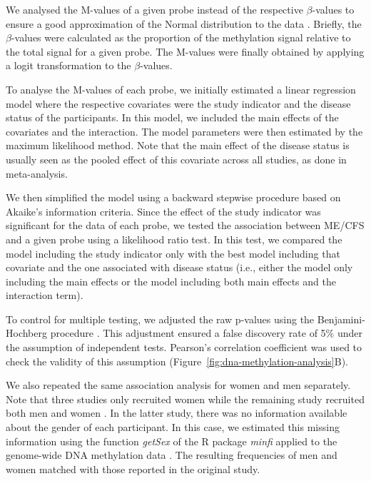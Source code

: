 We analysed the M-values of a given probe instead of the respective $\beta$-values to ensure a good approximation of the Normal distribution to the data \citep{du2010ComparisonBetavalue}. Briefly, the $\beta$-values were calculated as the proportion of the methylation signal relative to the total signal for a given probe. The M-values were finally obtained by applying a logit transformation to the $\beta$-values.

To analyse the M-values of each probe, we initially estimated a linear regression model where the respective covariates were the study indicator and the disease status of the participants. In this model, we included the main effects of the covariates and the interaction. The model parameters were then estimated by the maximum likelihood method. Note that the main effect of the disease status is usually seen as the pooled effect of this covariate across all studies, as done in meta-analysis.

We then simplified the model using a backward stepwise procedure based on Akaike's information criteria. Since the effect of the study indicator was significant for the data of each probe, we tested the association between ME/CFS and a given probe using a likelihood ratio test. In this test, we compared the model including the study indicator only with the best model including that covariate and the one associated with disease status (i.e., either the model only including the main effects or the model including both main effects and the interaction term).

To control for multiple testing, we adjusted the raw p-values using the Benjamini-Hochberg procedure \citep{benjaminiControllingFalseDiscovery1995}. This adjustment ensured a false discovery rate of 5\% under the assumption of independent tests. Pearson's correlation coefficient was used to check the validity of this assumption (Figure~\ref{fig:dna-methylation-analysis}B).

We also repeated the same association analysis for women and men separately. Note that three studies only recruited women \citep{vegaDNAMethylationModifications2014, vegaEpigeneticModificationsGlucocorticoid2017, trivedi2018IdentificationMyalgic} while the remaining study recruited both men and women \citep{herrera2018GenomeepigenomeInteractions}. In the latter study, there was no information available about the gender of each participant. In this case, we estimated this missing information using the function \textit{getSex} of the R package \textit{minfi} applied to the genome-wide DNA methylation data \citep{aryee2014MinfiFlexible}. The resulting frequencies of men and women matched with those reported in the original study.

